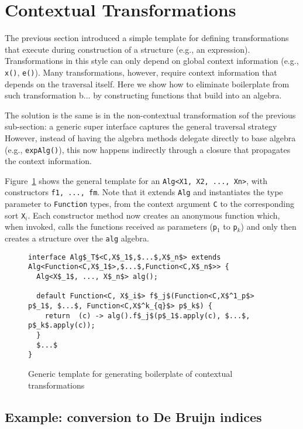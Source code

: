 \section{Contextual Transformations}\label{sec:contexttrans}

The previous section introduced a simple template for defining transformations that execute during construction of a structure (e.g., an expression).
Transformations in this style can only depend on global context information (e.g., \lstinline{x()}, \lstinline{e()}).
Many transformations, however, require context information that depends on the traversal itself.
Here we show how to eliminate boilerplate from such transformation b...  by constructing functions that build into an algebra.

The solution is the same is in the non-contextual transformation sof the previous sub-section: a generic super interface captures the general traversal strategy
However, instead of having the algebra methods delegate directly to base algebra (e.g., \lstinline{expAlg()}), this now happens indirectly through a closure that propagates the context information.

Figure~\ref{ctxTrafoTemplate} shows the general template for an \lstinline{Alg<X1, X2, ..., Xn>}, with constructors \lstinline{f1, ..., fm}.
Note that it extends \lstinline{Alg} and instantiates the type parameter to \lstinline{Function} types, from the context argument \lstinline{C} to the corresponding sort \lstinline{X}$_i$. 
Each constructor method now creates an anonymous function which, when invoked, calls the functions received as parameters (\lstinline{p}$_1$ to \lstinline{p}$_k$) and only then creates a structure over the \lstinline{alg} algebra.

\begin{figure}[t]
\begin{lstlisting}[mathescape=true]
interface Alg$_T$<C,X$_1$,$...$,X$_n$> extends Alg<Function<C,X$_1$>,$...$,Function<C,X$_n$>> {
  Alg<X$_1$, ..., X$_n$> alg();

  default Function<C, X$_i$> f$_j$(Function<C,X$^1_p$> p$_1$, $...$, Function<C,X$^k_{q}$> p$_k$) {
    return  (c) -> alg().f$_j$(p$_1$.apply(c), $...$, p$_k$.apply(c));
  }
  $...$
}
\end{lstlisting}
\caption{Generic template for generating boilerplate of contextual transformations}
\label{ctxTrafoTemplate}
\end{figure}

\subsection{Example: conversion to De Bruijn indices}

